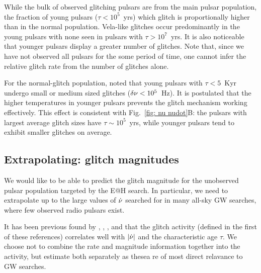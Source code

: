 \documentclass[../full_thesis/full_thesis.tex]{subfiles}
\begin{document}
While the bulk of observed glitching pulsars are from the main pulsar population, the
fraction of young pulsars ($\tau < 10^{5}$~yrs) which glitch is proportionally
higher than in the normal population. Vela-like glitches occur predominantly
in the young pulsars with none seen in pulsars with $\tau > 10^{7}$~yrs. It
is also noticeable that younger pulsars display a greater number of glitches. Note
that, since we have not observed all pulsars
for the some period of time, one cannot infer the relative glitch rate from the
number of glitches alone.


For the normal-glitch population, \citet{Espinoza2011} noted that young pulsars
with $\tau < 5 $~Kyr undergo small or medium sized glitches ($\delta\nu < 10^{5}$~Hz).
It is postulated that the higher temperatures in younger pulsars prevents
the glitch mechanism working effectively. This effect is consistent with
Fig.~\ref{fig: nu nudot}B: the pulsars with largest average glitch sizes have
$\tau \sim 10^{5}$~yrs, while younger pulsars tend to exhibit smaller glitches
on average.

\subsection{Extrapolating: glitch magnitudes}

We would like to be able to predict the glitch magnitude for the unobserved
pulsar population targeted by the E@H search. In particular, we need to
extrapolate up to the large values of $\dot{\nu}$ searched for in many all-sky
GW searches, where few observed radio pulsars exist.

It has been previous found by \citet{Mckenna1990}, \citet{Lyne2000},
\citet{Wang2000}, and \citet{Espinoza2011}
that the glitch activity (defined in the first of these references) correlates
well with $|\dot{\nu}|$ and the characteristic age
$\tau$. We choose not to combine the rate and
magnitude information together into the activity, but estimate both separately
as thesea re of most direct relavance to GW searches.
\end{document}

